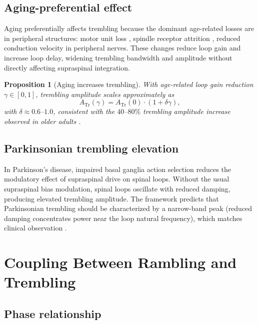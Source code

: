 \documentclass[11pt,twocolumn,a4paper]{article}
\newtheorem{proposition}[theorem]{Proposition}
\theoremstyle{definition}
\theoremstyle{remark}
\newcommand{\Tr}{\mathrm{Tr}}
\begin{document}
\subsection{Aging-preferential effect}

Aging preferentially affects trembling because the dominant
age-related losses are in peripheral structures: motor unit loss
\citep{gilchrist1995}, spindle receptor attrition \citep{shaffer2007},
reduced conduction velocity in peripheral nerves. These changes
reduce loop gain and increase loop delay, widening trembling
bandwidth and amplitude without directly affecting supraspinal
integration.

\begin{proposition}[Aging increases trembling]
With age-related loop gain reduction $\gamma \in [0, 1]$,
trembling amplitude scales approximately as
\begin{equation}
A_{\Tr}(\gamma) = A_{\Tr}(0) \cdot (1 + \delta \gamma),
\end{equation}
with $\delta \approx 0.6$--$1.0$, consistent with the
$40$--$80\%$ trembling amplitude increase observed in older adults
\citep{prieto1996,maurer2005}.
\end{proposition}

\subsection{Parkinsonian trembling elevation}

In Parkinson's disease, impaired basal ganglia action selection
reduces the modulatory effect of supraspinal drive on spinal
loops. Without the usual supraspinal bias modulation, spinal
loops oscillate with reduced damping, producing elevated
trembling amplitude. The framework predicts that Parkinsonian
trembling should be characterized by a narrow-band peak (reduced
damping concentrates power near the loop natural frequency), which
matches clinical observation \citep{mancini2012,schmit2006}.


\section{Coupling Between Rambling and Trembling}
\label{sec:coupling}

\subsection{Phase relationship}
\end{document}
